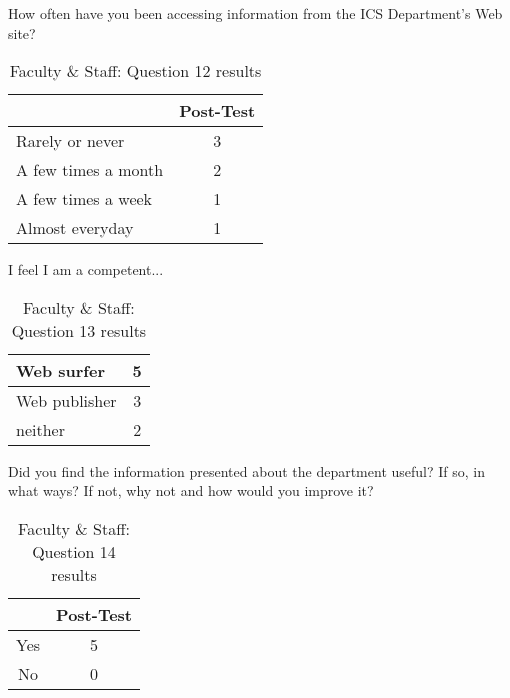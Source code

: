 \begin{table}[htbp]
\caption{Faculty \& Staff: Question 12 results}
{How often have you been accessing information from the ICS
  Department's Web site?}
\begin{center}
\begin{tabular}{|l|c|} \hline
  & {\bf Post-Test} \\ \hline 
 {Rarely or never} & 3 \\ \hline 
 {A few times a month} & 2 \\ \hline 
 {A few times a week} & 1 \\ \hline 
 {Almost everyday} & 1 \\ \hline 
\end{tabular}
\end{center}
\label{tab:question12a}
\end{table}

\begin{table}[htbp]
\caption{Faculty \& Staff: Question 13 results}
{I feel I am a competent...}
\begin{center}
\begin{tabular}{|l|c|} \hline
 {Web surfer} & 5 \\ \hline 
 {Web publisher} & 3 \\ \hline 
 {neither} & 2 \\ \hline 
\end{tabular}
\end{center}
\label{tab:question13a}
\end{table}

\begin{table}[htbp]
\caption{Faculty \& Staff: Question 14 results}
{Did you find the information presented about the department useful?
  If so, in what ways?  If not, why not and how would you improve it?}
\begin{center}
\begin{tabular}{|c|c|} \hline
  & {\bf Post-Test} \\ \hline 
 Yes & 5 \\ \hline 
 No  & 0 \\ \hline 
\end{tabular}
\end{center}
\label{tab:question14a}
\end{table}


